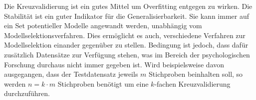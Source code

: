 Die Kreuzvalidierung ist ein gutes Mittel um Overfitting entgegen zu wirken.
Die Stabilität ist ein guter Indikator für die Generalisierbarkeit. Sie kann immer auf ein Set potentieller Modelle angewandt werden, unabhängig vom Modellselektionsverfahren. Dies ermöglicht es auch, verschiedene Verfahren zur Modellselektion einander gegenüber zu stellen.
Bedingung ist jedoch, dass dafür zusätzlich Datensätze zur Verfügung stehen, was im Bereich der psychologischen Forschung durchaus nicht immer gegeben ist.
Wird beispielsweise davon ausgegangen, dass der Testdatensatz jeweils $m$ Stichproben beinhalten soll, so werden $n = k \cdot m$ Stichproben benötigt um eine $k$-fachen Kreuzvalidierung durchzuführen. 